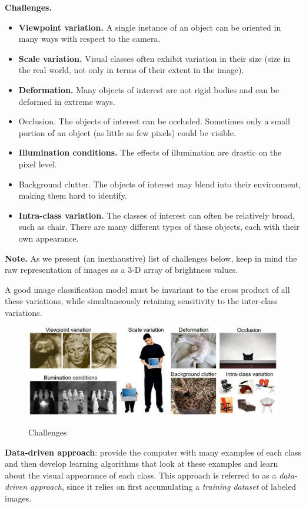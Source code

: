 \textbf{Challenges.} 
\begin{itemize}
  \item \textbf{Viewpoint variation.} A single instance of an object can be oriented in many ways with respect to the camera.
  \item \textbf{Scale variation.} Visual classes often exhibit variation in their size (size in the real world, not only in terms of their extent in the image).
  \item \textbf{Deformation.} Many objects of interest are not rigid bodies and can be deformed in extreme ways.
  \item Occlusion. The objects of interest can be occluded. Sometimes only a small portion of an object (as little as few pixels) could be visible.
  \item \textbf{Illumination conditions.} The effects of illumination are drastic on the pixel level.
  \item Background clutter. The objects of interest may blend into their environment, making them hard to identify.
  \item \textbf{Intra-class variation.} The classes of interest can often be relatively broad, such as chair. There are many different types of these objects, each with their own appearance.
\end{itemize}
\textbf{Note.} As we present (an inexhaustive) list of challenges below, keep in mind the raw representation of images as a 3-D array of brightness values.

A good image classification model must be invariant to the cross product of all these variations, while simultaneously retaining sensitivity to the inter-class variations. 

\begin{figure}
  \centering
  \includegraphics[width=5 in]{pic/challenges}\\
  \caption{Challenges}
\end{figure}

\textbf{Data-driven approach}: provide the computer with many examples of each class and then develop learning algorithms that look at these examples and learn about the visual appearance of each class.
This approach is referred to as a \emph{data-driven approach}, since it relies on first accumulating a \emph{training dataset} of labeled images. 
\quad

